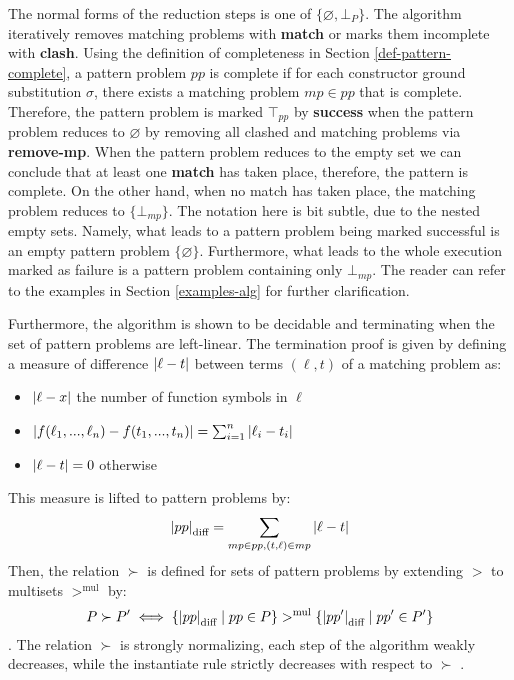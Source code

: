 The normal forms of the reduction steps is one of $\{\varnothing, \bot_{P}\}$. The algorithm iteratively removes matching problems with \textbf{match} or marks them incomplete with \textbf{clash}. Using the definition of completeness in Section \ref{def-pattern-complete}, a pattern problem $pp$ is complete if for each constructor ground substitution $\sigma$, there exists a matching problem $mp \in pp$ that is complete. Therefore, the pattern problem is marked $\top_{pp}$ by \textbf{success} when the pattern problem reduces to $\varnothing$ by removing all clashed and matching problems via \textbf{remove-mp}. When the pattern problem reduces to the empty set we can conclude that at least one \textbf{match} has taken place, therefore, the pattern is complete. On the other hand, when no match has taken place, the matching problem reduces to $\{\bot_{mp}\}$. The notation here is bit subtle, due to the nested empty sets. Namely, what leads to a pattern problem being marked successful is an empty pattern problem $\{\varnothing\}$. Furthermore, what leads to the whole execution marked as failure is a pattern problem containing only $\bot_{mp}$. The reader can refer to the examples in Section \ref{examples-alg} for further clarification.

Furthermore, the algorithm is shown to be decidable and terminating when the set of pattern problems are left-linear\cite{thiemann}. The termination proof is given by defining a measure of difference $\abs{\ell - t}$ between terms \((\ell, t)\) of a matching problem as:
\begin{itemize}
    \item $\abs{\ell - x}$ the number of function symbols in $\ell$
    \item $\abs{f(\ell_1, ..., \ell_n) - f(t_1,...,t_n)} = \sum_{i=1}^{n} \abs{\ell_i - t_i}$
    \item $\abs{\ell - t} = 0$ otherwise
\end{itemize}
This measure is lifted to pattern problems by: 
$$\abs{pp}_{\text{diff}} = \sum_{mp \in pp, (t, \ell) \in mp} \abs{\ell - t}$$
Then, the relation $\succ$ is defined for sets of pattern problems by extending $>$ to multisets $>^{\text{mul}}$ by: 
$$P \succ P' \iff \{\abs{pp}_\text{diff} \mid pp \in P\} >^{\text{mul}} \{\abs{pp'}_\text{diff} \mid pp' \in P'\}$$.
The relation $\succ$ is strongly normalizing, each step of the algorithm weakly decreases, while the instantiate rule strictly decreases with respect to $\succ$ \cite{thiemann}. 

